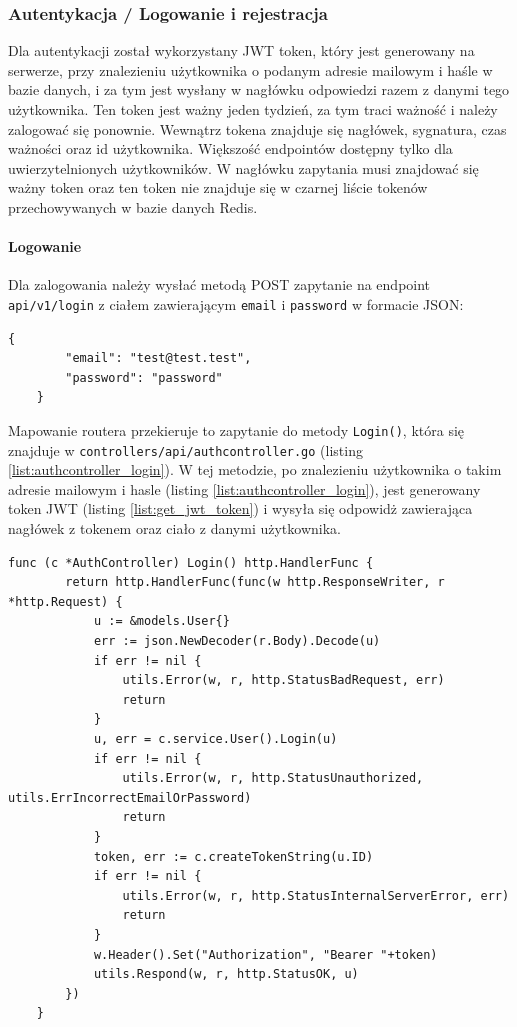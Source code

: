 \subsubsection{Autentykacja / Logowanie i rejestracja}
\label{sec:autentykacja}
Dla autentykacji został wykorzystany JWT token, który jest generowany na serwerze, przy znalezieniu użytkownika o podanym adresie mailowym i haśle w bazie danych, i za tym jest wysłany w nagłówku odpowiedzi razem z danymi tego użytkownika.
Ten token jest ważny jeden tydzień, za tym traci ważność i należy zalogować się ponownie. Wewnątrz tokena znajduje się nagłówek, sygnatura, czas ważności oraz id użytkownika.
Większość endpointów dostępny tylko dla uwierzytelnionych użytkowników. W nagłówku zapytania musi znajdować się ważny token oraz ten token nie znajduje się w czarnej liście tokenów przechowywanych w bazie danych Redis.

\paragraph{Logowanie\newline}
Dla zalogowania należy wysłać metodą POST zapytanie na endpoint \texttt{api/v1/login} z ciałem zawierającym \texttt{email} i \texttt{password} w formacie JSON:
\begin{lstlisting}[basicstyle=\tiny\ttfamily]
    {
        "email": "test@test.test",
        "password": "password"
    }
\end{lstlisting}

Mapowanie routera przekieruje to zapytanie do metody \texttt{Login()}, która się znajduje w \texttt{controllers/api/authcontroller.go} (listing \ref{list:authcontroller_login}).
W tej metodzie, po znalezieniu użytkownika o takim adresie mailowym i hasle (listing \ref{list:authcontroller_login}), jest generowany token JWT (listing \ref{list:get_jwt_token}) i wysyła się odpowidż zawierająca nagłówek z tokenem oraz ciało z danymi użytkownika.
\begin{lstlisting}[label=list:authcontroller_login,caption=Kontroller logowania użytkownika,basicstyle=\tiny\ttfamily]
    func (c *AuthController) Login() http.HandlerFunc {
        return http.HandlerFunc(func(w http.ResponseWriter, r *http.Request) {
            u := &models.User{}
            err := json.NewDecoder(r.Body).Decode(u)
            if err != nil {
                utils.Error(w, r, http.StatusBadRequest, err)
                return
            }
            u, err = c.service.User().Login(u)
            if err != nil {
                utils.Error(w, r, http.StatusUnauthorized, utils.ErrIncorrectEmailOrPassword)
                return
            }
            token, err := c.createTokenString(u.ID)
            if err != nil {
                utils.Error(w, r, http.StatusInternalServerError, err)
                return
            }
            w.Header().Set("Authorization", "Bearer "+token)
            utils.Respond(w, r, http.StatusOK, u)
        })
    }
\end{lstlisting}


